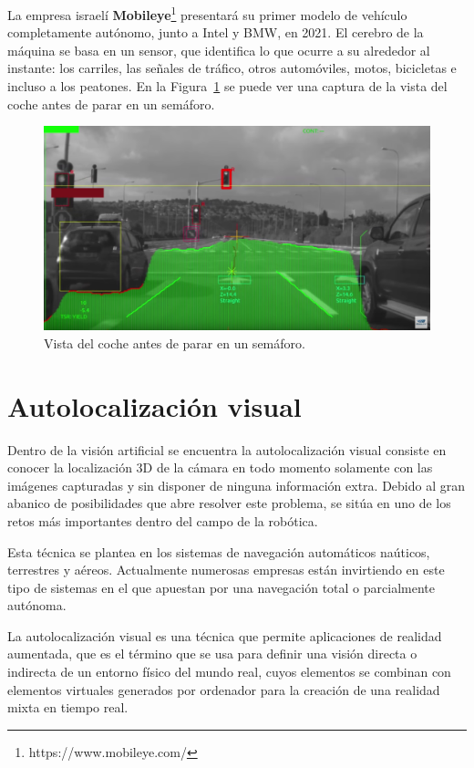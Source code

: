 La empresa israelí \textbf{Mobileye}\footnote{https://www.mobileye.com/} presentará su primer modelo de vehículo completamente autónomo, junto a Intel y BMW, en 2021. El cerebro de la máquina se basa en un sensor, que identifica lo que ocurre a su alrededor al instante: los carriles, las señales de tráfico, otros automóviles, motos, bicicletas e incluso a los peatones. En la Figura~\ref{fig:Car} se puede ver una captura de la vista del coche antes de parar en un semáforo.

\begin{figure}[th]
\centering
\includegraphics[scale=0.3]{Figures/car.png}
\decoRule
\caption[Visión para la autoconducción]{Vista del coche antes de parar en un semáforo.}
\label{fig:Car}
\end{figure}


\section{Autolocalización visual}
Dentro de la visión artificial se encuentra la autolocalización visual consiste en conocer la localización 3D de la cámara en todo momento solamente con las imágenes capturadas y sin disponer de ninguna información extra. Debido al gran abanico de posibilidades que abre resolver este problema, se sitúa en uno de los retos más importantes dentro del campo de la robótica.

Esta técnica se plantea en los sistemas de navegación automáticos naúticos, terrestres y aéreos. Actualmente numerosas empresas están invirtiendo en este tipo de sistemas en el que apuestan por una navegación total o parcialmente autónoma.

La autolocalización visual es una técnica que permite aplicaciones de realidad aumentada, que es el término que se usa para definir una visión directa o indirecta de un entorno físico del mundo real, cuyos elementos se combinan con elementos virtuales generados por ordenador para la creación de una realidad mixta en tiempo real.

